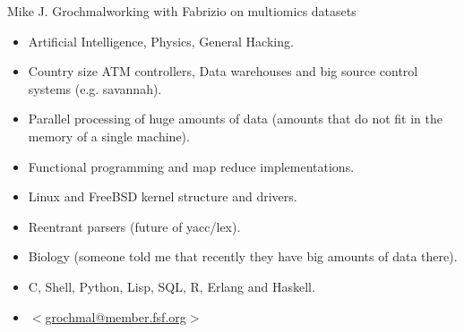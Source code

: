 \documentclass[hyperref={colorlinks=true}]{beamer}
\begin{document}
\begin{frame}{Mike J. Grochmal}{working with Fabrizio on multiomics datasets}
  \begin{itemize}

\item[Background in  ]
Artificial Intelligence, Physics, General Hacking.

\item[Worked with  ]
Country size ATM controllers, Data warehouses and big source control systems
(e.g. savannah).

\item[Research interests  ]
Parallel processing of huge amounts of data (amounts that do not fit in the
memory of a single machine).

\item[-  ]
Functional programming and map reduce implementations.

\item[-  ]
Linux and FreeBSD kernel structure and drivers.

\item[-  ]
Reentrant parsers (future of yacc/lex).

\item[-  ]
Biology (someone told me that recently they have big amounts of data there).

\item[Favourite tools  ]
C, Shell, Python, Lisp, SQL, R, Erlang and Haskell.

\item[email  ]
$<$\href{mailto:grochmal@member.fsf.org}{grochmal@member.fsf.org}$>$

  \end{itemize}
\end{frame}
\end{document}

